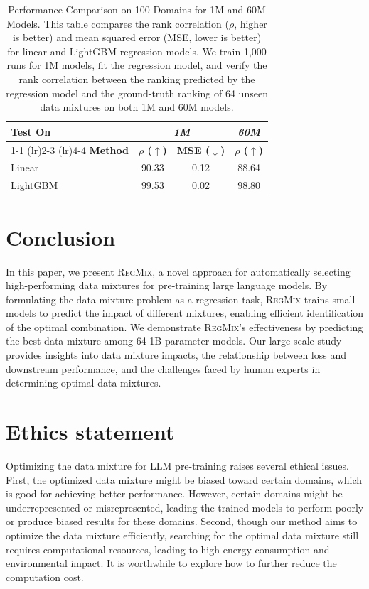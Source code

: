 \documentclass{article}
\theoremstyle{definition}
\theoremstyle{remark}
\newcommand{\ourmethod}{\textsc{RegMix}\xspace}
\begin{document}
\begin{table}[t]
    \centering
    \small
    \caption{Performance Comparison on 100 Domains for 1M and 60M Models. This table compares the rank correlation ($\rho$, higher is better) and mean squared error (MSE, lower is better) for linear and LightGBM regression models. 
    We train 1,000 runs for 1M models, fit the regression model, and verify the rank correlation between the ranking predicted by the regression model and the ground-truth ranking of 64 unseen data mixtures on both 1M and 60M models.}
    \label{tab:linear_vs_lightgbm_more_domains}
    \vspace{1mm}
    \begin{tabular}{lccc}
        \toprule
        {Test On} & \multicolumn{2}{c}{\textit{1M}} & {\textit{60M}}  \\
        \cmidrule(lr){1-1} \cmidrule(lr){2-3}  \cmidrule(lr){4-4}
        \textbf{Method} & \textbf{$\rho$ ($\uparrow$)} & \textbf{MSE ($\downarrow$)} & \textbf{$\rho$ ($\uparrow$)} \\
        \midrule
        Linear & 90.33 & 0.12  & 88.64  \\
        {LightGBM} & {99.53} & {0.02} & {98.80} \\
        \bottomrule
    \end{tabular}
\end{table}

\vspace{-2mm}
\section{Conclusion}
\vspace{-2mm}

In this paper, we present \ourmethod, a novel approach for automatically selecting high-performing data mixtures for pre-training large language models. By formulating the data mixture problem as a regression task, \ourmethod trains small models to predict the impact of different mixtures, enabling efficient identification of the optimal combination. We demonstrate \ourmethod's effectiveness by predicting the best data mixture among 64 1B-parameter models. Our large-scale study provides insights into data mixture impacts, the relationship between loss and downstream performance, and the challenges faced by human experts in determining optimal data mixtures.

\clearpage
\section*{Ethics statement} 
Optimizing the data mixture for LLM pre-training raises several ethical issues. 
First, the optimized data mixture might be biased toward certain domains, which is good for achieving better performance. However, certain domains might be underrepresented or misrepresented, leading the trained models to perform poorly or produce biased results for these domains.
Second, though our method aims to optimize the data mixture efficiently, searching for the optimal data mixture still requires computational resources, leading to high energy consumption and environmental impact.
It is worthwhile to explore how to further reduce the computation cost. 
\end{document}
